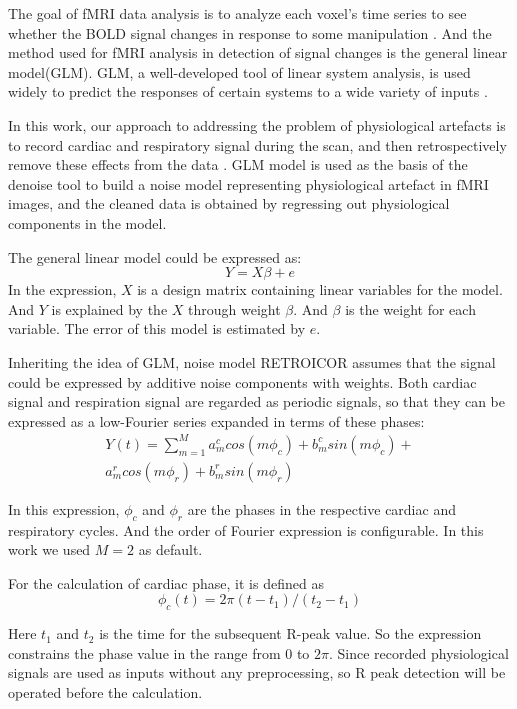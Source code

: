 The goal of fMRI data analysis is to analyze each voxel's time series to see whether the BOLD signal changes in response to some manipulation \cite{poldrack2011handbook}.
And the method used for fMRI analysis in detection of signal changes is the general linear model(GLM). 
GLM, a well-developed tool of linear system analysis, is used widely to predict the responses of certain systems to a wide variety of inputs \cite{cohen1997parametric}.

In this work, our approach to addressing the problem of physiological artefacts is to record cardiac and respiratory signal during the scan, and then retrospectively remove these effects from the data \cite{glover2000image}.
GLM model is used as the basis of the denoise tool to build a noise model representing physiological artefact in fMRI images, and the cleaned data is obtained by regressing out physiological components in the model.

The general linear model could be expressed as:
\begin{equation}
\label{eqn:glm}
    Y = X\beta + e
\end{equation}
In the expression, $X$ is a design matrix containing linear variables for the model. And $Y$ is explained by the $X$ through weight $\beta$. And $\beta$ is the weight for each variable. The error of this model is estimated by $e$.

Inheriting the idea of GLM, noise model RETROICOR assumes that the signal could be expressed by additive noise components with weights. Both cardiac signal and respiration signal are regarded as periodic signals, 
so that they can be expressed as a low-Fourier series expanded in terms of these phases:
\begin{multline}
    Y(t) = \sum_{m = 1}^{M} a_m^c cos(m\phi_c) + b_m^c sin(m\phi_c) + \\ a_m^r cos(m\phi_r) + b_m^r sin(m\phi_r)
\end{multline}

In this expression, $\phi_c$ and $\phi_r$ are the phases in the respective cardiac and respiratory cycles. 
And the order of Fourier expression is configurable. In this work we used $M = 2$ as default.

For the calculation of cardiac phase, it is defined as
\begin{equation}
\label{eqn:cardiac}
    \phi_c(t) = 2\pi(t-t_1)/(t_2-t_1)
\end{equation}

Here $t_1$ and $t_2$ is the time for the subsequent R-peak value. 
So the expression constrains the phase value in the range from $0$ to $2\pi$. 
Since recorded physiological signals are used as inputs without any preprocessing, so R peak detection will be operated before the calculation.

